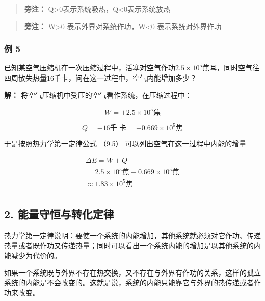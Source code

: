 \begin{quote}
\textbf{旁注：} Q\textgreater0表示系统吸热，Q\textless0表示系统放热
\end{quote}

\begin{quote}
\textbf{旁注：} W\textgreater0 表示外界对系统作功，W\textless0
表示系统对外界作功
\end{quote}

\subsubsection{例 5}\label{ux4f8b-5-5}

已知某空气压缩机在一次压缩过程中，活塞对空气作功\(2.5 \times 10^{5}\)焦耳，同时空气往四周散失热量16千卡，问在这一过程中，空气内能增加多少？

\textbf{解：} 将空气压缩机中受压的空气看作系统，在压缩过程中：

\[
W = + 2.5 \times 10 ^ {5} \text{焦}
\]

\[
Q = - 16 \text{千   卡} = - 0.669 \times 10 ^ {5} \text{焦}
\]

于是按照热力学第一定律公式 （9.5） 可以列出空气在这一过程中内能的增量

\[
\begin{array}{l} \Delta E = W + Q \\ = 2.5 \times 10 ^ {5} \text{焦} - 0.669 \times 10 ^ {5} \text{焦} \\ \approx 1.83 \times 10 ^ {5} \text{焦} \\ \end{array}
\]

\subsection{2.
能量守恒与转化定律}\label{ux80fdux91cfux5b88ux6052ux4e0eux8f6cux5316ux5b9aux5f8b}

热力学第一定律说明：要使一个系统的内能增加，其他系统就必须对它作功、传递热量或者既作功又传递热量；同时可以看出一个系统内能的增加是以其他系统的内能减少为代价的。

如果一个系统既与外界不存在热交换，又不存在与外界有作功的关系，这样的孤立系统的内能是不会改变的。这就是说，系统的内能只能靠它与外界的热传递或者作功来改变。

